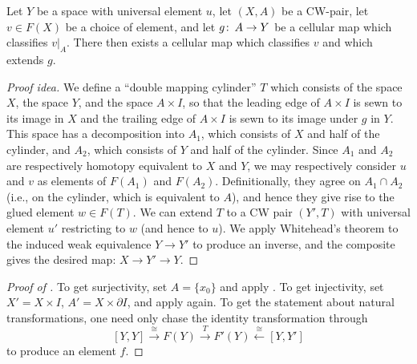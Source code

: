 \begin{lemma}\label{ClassifiedMapsAlwaysExtend}%
Let $Y$ be a space with universal element $u$, let $(X, A)$ be a CW-pair, let $v \in F(X)$ be a choice of element, and let $g\colon\thinspace A \to Y$ be a cellular map which classifies $v|_A$.
There then exists a cellular map which classifies $v$ and which extends $g$.
\end{lemma}
\begin{proof}[Proof idea]
We define a ``double mapping cylinder'' $T$ which consists of the space $X$, the space $Y$, and the space $A \times I$, so that the leading edge of $A \times I$ is sewn to its image in $X$ and the trailing edge of $A \times I$ is sewn to its image under $g$ in $Y$.
This space has a decomposition into $A_1$, which consists of $X$ and half of the cylinder, and $A_2$, which consists of $Y$ and half of the cylinder.
Since $A_1$ and $A_2$ are respectively homotopy equivalent to $X$ and $Y$, we may respectively consider $u$ and $v$ as elements of $F(A_1)$ and $F(A_2)$.
Definitionally, they agree on $A_1 \cap A_2$ (i.e., on the cylinder, which is equivalent to $A$), and hence they give rise to the glued element $w \in F(T)$.
We can extend $T$ to a CW pair $(Y', T)$ with universal element $u'$ restricting to $w$ (and hence to $u$).
We apply Whitehead's theorem to the induced weak equivalence $Y \to Y'$ to produce an inverse, and the composite gives the desired map: $X \to Y' \to Y$.
\end{proof}

\begin{proof}[{Proof of }]
To get surjectivity, set $A = \{x_0\}$ and apply .
To get injectivity, set $X' = X \times I$, $A' = X \times \partial I$, and apply  again.
To get the statement about natural transformations, one need only chase the identity transformation through \[[Y, Y] \xrightarrow\cong F(Y) \xrightarrow{T} F'(Y) \xleftarrow\cong [Y, Y']\] to produce an element $f$.
\end{proof}

